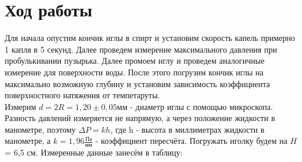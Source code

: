 \documentclass[a4paper, 12pt]{article}
\begin{document}
	\section*{Ход работы}
        Для начала опустим кончик иглы в спирт и установим скорость капель примерно 1 капля в 5 секунд.
        Далее проведем измерение максимального давления при пробулькивании пузырька. Далее промоем иглу и проведем аналогичные измерение для поверхности воды.
        После этого погрузим кончик иглы на максимально возможную глубину и установим зависимость коэффициента поверхностного натяжения от темпетаруты.
        \\  
		Измерим $d = 2R = 1,20 \pm 0,05$мм - диаметр иглы с помощью микроскопа.
		Разность давлений измеряется не напрямую, а через положение жидкости в манометре, поэтому $\Delta P = k h$, где h - высота в миллиметрах жидкости в манометре, а $k = 1,96 \frac{Па}{мм}$ - коэффициент пересчёта. 
        Погружать иголку будем на $H$ = 6,5 см. Измеренные данные занесём в таблицу:
\end{document}
